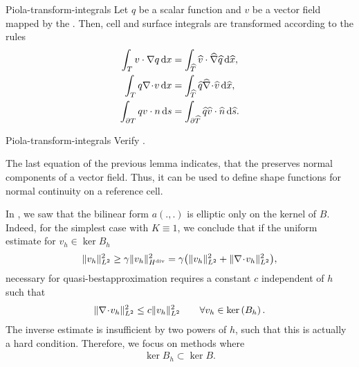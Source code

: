 \begin{Lemma}{Piola-transform-integrals}
  Let $q$ be a scalar function and $v$ be a 
  vector field mapped by the . Then, cell
  and surface integrals are transformed according to the rules
  \begin{gather}
    \begin{split}
      \int_{T} v \cdot \nabla q \,\mathrm{d} x
      &= \int_{\widehat {T}} \widehat v \cdot \widehat \nabla \widehat q \,\mathrm{d} \widehat x,
      \\
      \int_{T} q \nabla\!\cdot\! v \,\mathrm{d} x
      &= \int_{\widehat {T}} \widehat q \widehat \nabla\!\cdot\! \widehat v \,\mathrm{d} \widehat x,
      \\
      \int_{\partial T} q v\cdot n \,\mathrm{d} s
      &= \int_{\partial\widehat {T}} \widehat q \widehat v\cdot\widehat {n} \,\mathrm{d} \widehat s.
    \end{split}
  \end{gather}
\end{Lemma}

\begin{Problem}{Piola-transform-integrals}
  Verify .
\end{Problem}

\begin{remark}
  The last equation of the previous lemma indicates, that the
   preserves normal components of a vector
  field. Thus, it can be used to define shape functions for normal
  continuity on a reference cell.
\end{remark}

\begin{intro}
  In , we saw that the
  bilinear form $a(.,.)$ is elliptic only on the kernel of
  $B$. Indeed, for the simplest case with $K\equiv 1$, we conclude
  that if the uniform estimate for $v_h\in \ker{B_h}$
  \begin{gather*}
    \lVert v_h\rVert^2_{L^2}
    \ge \gamma \lVert v_h\rVert^2_{H^{\text{div}}}
    = \gamma \bigl(\lVert v_h\rVert^2_{L^2} + \lVert\nabla\!\cdot\! v_h\rVert^2_{L^2}\bigr),
  \end{gather*}
  necessary for quasi-bestapproximation requires a constant $c$
  independent of $h$ such that
  \begin{gather*}
    \lVert\nabla\!\cdot\! v_h\rVert^2_{L^2} \le c \lVert v_h\rVert^2_{L^2}
    \qquad\forall v_h\in\operatorname{ker}\left(B_h\right).
  \end{gather*}
  The inverse estimate is insufficient by two powers of $h$, such that
  this is actually a hard condition. Therefore, we focus on
  methods where
  \begin{gather}
    \label{eq:darcy:16}
    \ker{B_h} \subset \ker B.
  \end{gather}
\end{intro}


